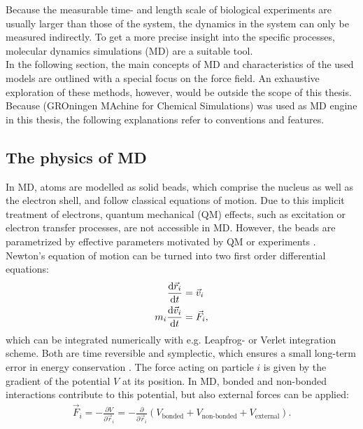 Because the measurable time- and length scale of biological experiments are usually larger than those of the system, the dynamics in the system can only be measured indirectly. To get a more precise insight into the specific processes, molecular dynamics simulations (MD) are a suitable tool.\\
In the following section, the main concepts of MD and characteristics of the used models are outlined with a special focus on the \martini{} force field. An exhaustive exploration of these methods, however, would be outside the scope of this thesis. Because \gromacs{} (GROningen MAchine for Chemical Simulations) \autocites{gromacs1, gromacsManual} was used as MD engine in this thesis, the following explanations refer to \gromacs{} conventions and features. 
\subsection{The physics of MD}
In MD, atoms are modelled as solid beads, which comprise the nucleus as well as the electron shell, and follow classical equations of motion. Due to this implicit treatment of electrons, quantum mechanical (QM) effects, such as excitation or electron transfer processes, are not accessible in MD. However, the beads are parametrized by effective parameters motivated by QM or experiments \autocite[p. 127-128]{greenBook}.\\
Newton's equation of motion can be turned into two first order differential equations:
\begin{align}
	\label{eq:eq_of_mot_first_order}
	\frac{\text{d} \vec{r}_i}{\text{d} t} &= \vec{v}_i \\
	m_i \frac{\text{d} \vec{v}_i}{\text{d} t} &= \vec{F}_{i},
\end{align}
which can be integrated numerically with e.g. Leapfrog- or Verlet integration scheme. Both are time reversible and symplectic, which ensures a small long-term error in energy conservation \autocite[p. 72-74]{UnderstandingMD}. The force acting on particle $i$ is given by the gradient of the potential $V$ at its position. In MD, bonded and non-bonded interactions contribute to this potential, but also external forces can be applied:
\begin{align}
	\vec{F}_i = - \frac{\partial V}{\partial \vec{r}_i} = - \frac{\partial}{\partial \vec{r}_i} \left(V_\text{bonded} + V_\text{non-bonded} + V_\text{external}\right).
\end{align}
